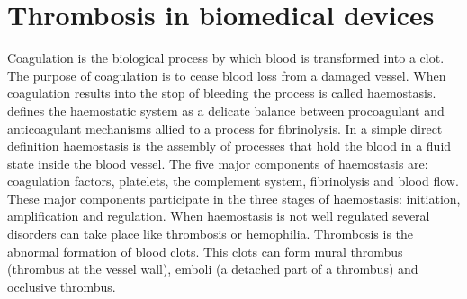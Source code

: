 \documentclass[%
 nofootinbib,
 amsmath,amssymb,
 aps,
 pra,
]{revtex4-1}
\begin{document}
\section{\label{sec:Blood}Thrombosis in biomedical devices}
Coagulation is the biological process by which blood is transformed into a clot. The purpose of coagulation is to cease blood loss from a damaged vessel. When coagulation results into the stop of bleeding the process is called haemostasis. \citet{Hoffbrand:2011} defines the haemostatic system as a delicate balance between procoagulant and anticoagulant mechanisms allied to a process for fibrinolysis. In a simple direct definition haemostasis is the assembly of processes that hold the blood in a fluid state inside the blood vessel. The five major components of haemostasis are: coagulation factors, platelets, the complement system, fibrinolysis and blood flow. These major components participate in the three stages of haemostasis: initiation, amplification and regulation. When haemostasis is not well regulated several disorders can take place like thrombosis or hemophilia. Thrombosis is the abnormal formation of blood clots. This clots can form mural thrombus (thrombus at the vessel wall), emboli (a detached part of a thrombus) and occlusive thrombus.\\ 
\end{document}
